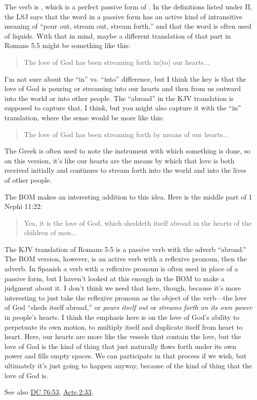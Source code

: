 		The verb is , which is a perfect passive form of . In the definitions listed under II, the LSJ says that the word in a passive form has an active kind of intransitive meaning of ``pour out, stream out, stream forth,'' and that the word is often used of liquids. With that in mind, maybe a different translation of that part in Romans 5:5 might be something like this:
		
		\begin{quote}
			The love of God has been streaming forth in(to) our hearts...
		\end{quote}
		
		I'm not sure about the ``in'' vs. ``into'' difference, but I think the key is that the love of God is pouring or streaming into our hearts and then from us outward into the world or into other people. The ``abroad'' in the KJV translation is supposed to capture that, I think, but you might also capture it with the ``in'' translation, where the sense would be more like this:
		
		\begin{quote}
			The love of God has been streaming forth by means of our hearts...
		\end{quote}
		
		The Greek  is often used to note the instrument with which something is done, so on this version, it's like our hearts are the means by which that love is both received initially and continues to stream forth into the world and into the lives of other people.
		
		The BOM makes an interesting addition to this idea. Here is the middle part of 1 Nephi 11:22:
		
		\begin{quote}
			Yea, it is the love of God, which sheddeth itself abroad in the hearts of the children of men...
		\end{quote}
		
		The KJV translation of Romans 5:5 is a passive verb with the adverb ``abroad.'' The BOM version, however, is an active verb with a reflexive pronoun, then the adverb. In Spanish a verb with a reflexive pronoun is often used in place of a passive form, but I haven't looked at this enough in the BOM to make a judgment about it. I don't think we need that here, though, because it's more interesting to just take the reflexive pronoun as the object of the verb---the love of God ``sheds itself abroad,'' or \textit{pours itself out} or \textit{streams forth on its own power} in people's hearts. I think the emphasis here is on the love of God's ability to perpetuate its own motion, to multiply itself and duplicate itself from heart to heart. Here, our hearts are more like the vessels that contain the love, but the love of God is the kind of thing that just naturally flows forth under its own power and fills empty spaces. We can participate in that process if we wish, but ultimately it's just going to happen anyway, because of the kind of thing that the love of God is.
		
		See also \hyperref[DC76-53]{DC 76:53}, \hyperref[ACTS-2-33]{Acts 2:33}, 